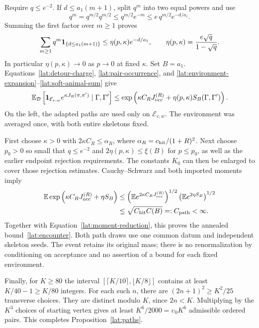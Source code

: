 Require $q\le e^{-2}$. If $d\le a_1(m+1)$, split $q^m$ into two equal
powers and use
\[
 q^m=q^{m/2}q^{m/2}\le q^{m/2}e^{-m}
                       \le e\,q^{m/2}e^{-d/a_1}.
\]
Summing the first factor over $m\ge1$ proves
\begin{equation}\label{lat:soft-animal-sum}
 \sum_{m\ge1}q^m\mathbf 1_{\{d\le a_1(m+1)\}}
 \le\eta(p,\kappa)e^{-d/a_1},
 \qquad \eta(p,\kappa)=\frac{e\sqrt q}{1-\sqrt q}.
\end{equation}
In particular $\eta(p,\kappa)\to0$ as $p\to0$ at fixed $\kappa$.
Set $B=a_1$. Equations~\eqref{lat:detour-charge},
\eqref{lat:pair-occurrence}, and
\eqref{lat:environment-expansion}--\eqref{lat:soft-animal-sum} give
\begin{equation}\label{lat:moment-reduction}
 \mathbb E_{\mathcal D}\left[
  \mathbf 1_{\mathcal E_{v,w}}e^{\kappa J_R(\pi,\pi')}
       \mid\Gamma,\Gamma'\right]
 \le\exp\left(\kappa C_RJ_{\rm occ}^{(R)}+
                      \eta(p,\kappa)S_B(\Gamma,\Gamma')\right).
\end{equation}
On the left, the adapted paths are used only on $\mathcal E_{v,w}$.
The environment was averaged once, with both entire skeletons fixed.

First choose $\kappa>0$ with $2\kappa C_R\le\alpha_R$, where
$\alpha_R=c_{\rm hit}/(1+R)^2$. Next choose $p_0>0$ so small that
$q\le e^{-2}$ and $2\eta(p,\kappa)\le\xi(B)$ for $p\le p_0$, as well
as the earlier endpoint rejection requirements. The constants $K_0$ can
then be enlarged to cover those rejection estimates. Cauchy--Schwarz and
both imported moments imply
\begin{align*}
 \mathbb E\exp\left(\kappa C_RJ_{\rm occ}^{(R)}+\eta S_B\right)
 &\le
 \left(\mathbb E e^{2\kappa C_RJ_{\rm occ}^{(R)}}\right)^{1/2}
 \left(\mathbb E e^{2\eta S_B}\right)^{1/2}\\
 &\le\sqrt{C_{\rm hit}C(B)}=:C_{\rm path}<\infty.
\end{align*}
Together with Equation~\eqref{lat:moment-reduction}, this proves the
annealed bound~\eqref{lat:encounter}. Both path draws use one common
datum and independent skeleton seeds. The event retains its original
mass; there is no renormalization by conditioning on acceptance and no
assertion of a bound for each fixed environment.

Finally, for $K\ge80$ the interval
$[\lceil K/10\rceil,\lfloor K/8\rfloor]$ contains at least
$K/40-1\ge K/80$ integers. For each such $n$, there are
$(2n+1)^2\ge K^2/25$ transverse choices. They are distinct modulo $K$,
since $2n<K$. Multiplying by the $K^3$ choices of starting vertex gives
at least $K^6/2000=\upsilon_0K^6$ admissible ordered pairs. This completes
Proposition~\ref{lat:paths}.
